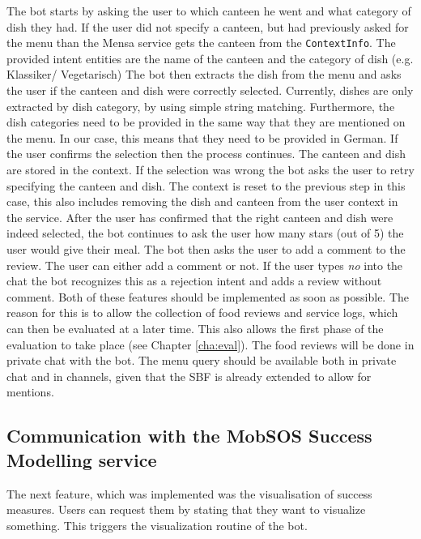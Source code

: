The bot starts by asking the user to which canteen he went and what category of dish they had. If the user did not specify a canteen, but had previously asked for the menu than the Mensa service gets the canteen from the \texttt{ContextInfo}. 
The provided intent entities are the name of the canteen and the category of dish (e.g. Klassiker/ Vegetarisch) 
The bot then extracts the dish from the menu and asks the user if the canteen and dish were correctly selected. Currently, dishes are only extracted by dish category, by using simple string matching. Furthermore, the dish categories need to be provided in the same way that they are mentioned on the menu. In our case, this means that they need to be provided in German.
If the user confirms the selection then the process continues. The canteen and dish are stored in the context. If the selection was wrong the bot asks the user to retry specifying the canteen and dish. The context is reset to the previous step in this case, this also includes removing the dish and canteen from the user context in the service.
After the user has confirmed that the right canteen and dish were indeed selected, the bot continues to ask the user how many stars (out of 5) the user would give their meal. 
The bot then asks the user to add a comment to the review. The user can either add a comment or not. If the user types \emph{no} into the chat the bot recognizes this as a rejection intent and adds a review without comment.
Both of these features should be implemented as soon as possible. The reason for this is to allow the collection of food reviews and service logs, which can then be evaluated at a later time.
This also allows the first phase of the evaluation to take place (see Chapter \ref{cha:eval}).
The food reviews will be done in private chat with the bot. The menu query should be available both in private chat and in channels, given that the SBF is already extended to allow for mentions.

\subsection{Communication with the MobSOS Success Modelling service}

The next feature, which was implemented was the visualisation of success measures. Users can request them by stating that they want to visualize something.
This triggers the visualization routine of the bot.

